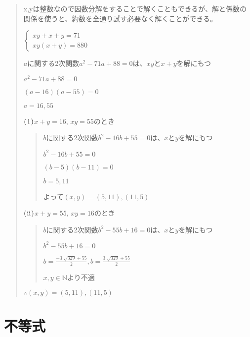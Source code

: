 \documentclass[uplatex,fleqn]{jsbook}
\begin{document}
\begin{quote}
    x,yは整数なので因数分解をすることで解くこともできるが、解と係数の関係を使うと、約数を全通り試す必要なく解くことができる。

    \begin{math}
        \begin{cases}
            xy+x+y=71\\
            xy\left(x+y\right)=880
        \end{cases}
    \end{math}

    $a$に関する2次関数$a^2-71a+88=0$は、$xy$と$x+y$を解にもつ

    $a^2-71a+88=0$

    $\left(a-16\right)\left(a-55\right)=0$

    $a=16,55$

    $\rm\left(\hspace{.18em}i\hspace{.18em}\right)$$x+y=16$, $xy=55$のとき

    \begin{quote}
        $b$に関する2次関数$b^2-16b+55=0$は、$x$と$y$を解にもつ

        $b^2-16b+55=0$

        $\left(b-5\right)\left(b-11\right)=0$

        $b=5,11$

        よって$\left(x,y\right)=\left(5,11\right),\left(11,5\right)$
    \end{quote}

    $\rm\left(\hspace{.08em}ii\hspace{.08em}\right)$$x+y=55$, $xy=16$のとき
    \begin{quote}
        $b$に関する2次関数$b^2-55b+16=0$は、$x$と$y$を解にもつ

        $b^2-55b+16=0$

        $\displaystyle b=\frac{-3 \; \sqrt{329} + 55}{2}, b=\frac{3 \; \sqrt{329} + 55}{2}$

        $x,y\in\mathbb{N}$より不適
    \end{quote}

    $\therefore \left(x,y\right)=\left(5,11\right),\left(11,5\right)$
\end{quote}

\section{不等式}
\end{document}
